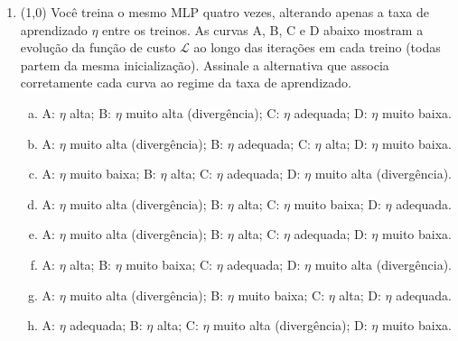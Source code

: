 \documentclass[11pt,a4paper]{article}
\begin{document}
\begin{enumerate}[1)]

\item (1{,}0) Você treina o mesmo MLP quatro vezes, alterando apenas a taxa de aprendizado $\eta$ entre os treinos. As curvas A, B, C e D abaixo mostram a evolução da função de custo $\mathcal{L}$ ao longo das iterações em cada treino (todas partem da mesma inicialização). Assinale a alternativa que associa corretamente cada curva ao regime da taxa de aprendizado.

\begin{center}
\end{center}

\begin{enumerate}[a)]
    \item A: $\eta$ alta; \quad B: $\eta$ muito alta (divergência); \quad C: $\eta$ adequada; \quad D: $\eta$ muito baixa.
    \item A: $\eta$ muito alta (divergência); \quad B: $\eta$ adequada; \quad C: $\eta$ alta; \quad D: $\eta$ muito baixa.
    \item A: $\eta$ muito baixa; \quad B: $\eta$ alta; \quad C: $\eta$ adequada; \quad D: $\eta$ muito alta (divergência).
    \item A: $\eta$ muito alta (divergência); \quad B: $\eta$ alta; \quad C: $\eta$ muito baixa; \quad D: $\eta$ adequada.
    \item A: $\eta$ muito alta (divergência); \quad B: $\eta$ alta; \quad C: $\eta$ adequada; \quad D: $\eta$ muito baixa.
    \item A: $\eta$ alta; \quad B: $\eta$ muito baixa; \quad C: $\eta$ adequada; \quad D: $\eta$ muito alta (divergência).
    \item A: $\eta$ muito alta (divergência); \quad B: $\eta$ muito baixa; \quad C: $\eta$ alta; \quad D: $\eta$ adequada.
    \item A: $\eta$ adequada; \quad B: $\eta$ alta; \quad C: $\eta$ muito alta (divergência); \quad D: $\eta$ muito baixa.
\end{enumerate}


\end{enumerate}
\end{document}
